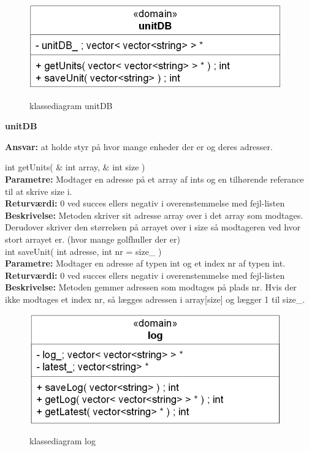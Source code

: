 \newpage

\begin{figure}[htbp] \centering
{\includegraphics[scale=1.5]{filer/design/Klassediagrammer/sw_unitDB}}
\caption{klassediagram unitDB}
\label{fig:unitDB klassediagram}
\end{figure} 

{\centering
\textbf{unitDB}\par
}
\textbf{Ansvar:} at holde styr på hvor mange enheder der er og deres adresser. \

int getUnits( \& int array, \& int size ) \\
\textbf{Parametre:}  Modtager en adresse på et array af ints og en tilhørende referance til at skrive size i.\\
\textbf{Returværdi:} 0 ved succes ellers negativ i overenstemmelse med fejl-listen \\
\textbf{Beskrivelse:} Metoden skriver sit adresse array over i det array som modtages. Derudover skriver den størrelsen på arrayet over i size så modtageren ved hvor stort arrayet er. (hvor mange golfhuller der er)\\

int saveUnit( int adresse, int nr = size\_ ) \\
\textbf{Parametre:} Modtager en adresse af typen int og et index nr af typen int. \\
\textbf{Returværdi:} 0 ved succes ellers negativ i overenstemmelse med fejl-listen \\
\textbf{Beskrivelse:}  Metoden gemmer adressen som modtages på plads nr. Hvis der ikke modtages et index nr, så lægges adressen i array[size] og lægger 1 til size\_. \\


\newpage
\begin{figure}[htbp] \centering
{\includegraphics[scale=1.5]{filer/design/Klassediagrammer/sw_log}}
\caption{klassediagram log}
\label{fig:log klassediagram}
\end{figure} 

